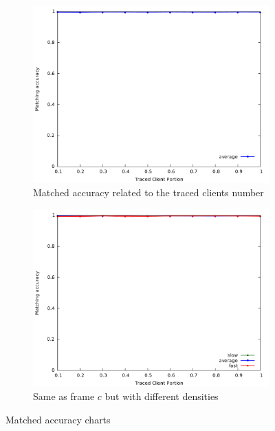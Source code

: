 \begin{figure}
	\begin{subfigure}{.5\textwidth}
		\centering
		\includegraphics[width=1\linewidth]{graphs/c_tclient_pmatch_average_only.pdf}
		\caption{Matched accuracy related to the traced clients number}
		\label{fig:g_maccuracyc}
	\end{subfigure}
	\begin{subfigure}{.5\textwidth}
		\centering
		\includegraphics[width=1\linewidth]{graphs/c_tclient_pmatch.pdf}
		\caption{Same as frame $c$ but with different densities}
		\label{fig:g_maccuracyd}
	\end{subfigure}

	\caption{Matched accuracy charts}
	\label{fig:g_maccuracy}
\end{figure}


